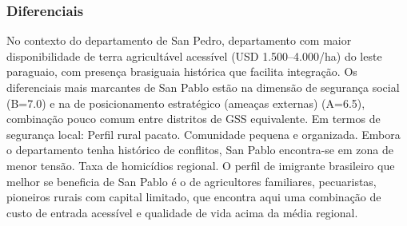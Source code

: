 \subsubsection*{Diferenciais}\label{dif-san-pablo-0209}
No contexto do departamento de San Pedro, departamento com maior disponibilidade de terra agricultável acessível (USD 1.500–4.000/ha) do leste paraguaio, com presença brasiguaia histórica que facilita integração. Os diferenciais mais marcantes de San Pablo estão na dimensão de segurança social (B=7.0) e na de posicionamento estratégico (ameaças externas) (A=6.5), combinação pouco comum entre distritos de GSS equivalente. Em termos de segurança local: Perfil rural pacato. Comunidade pequena e organizada. Embora o departamento tenha histórico de conflitos, San Pablo encontra-se em zona de menor tensão. Taxa de homicídios regional. O perfil de imigrante brasileiro que melhor se beneficia de San Pablo é o de agricultores familiares, pecuaristas, pioneiros rurais com capital limitado, que encontra aqui uma combinação de custo de entrada acessível e qualidade de vida acima da média regional.
